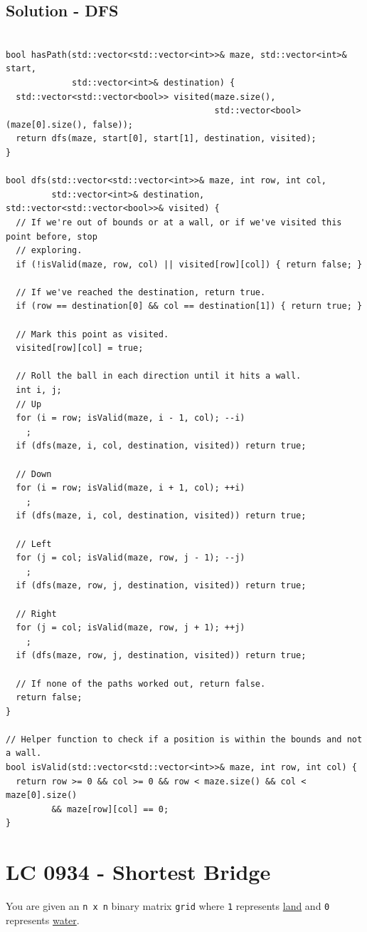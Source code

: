 \subsection*{Solution - DFS}
\begin{lstlisting}

bool hasPath(std::vector<std::vector<int>>& maze, std::vector<int>& start,
             std::vector<int>& destination) {
  std::vector<std::vector<bool>> visited(maze.size(),
                                         std::vector<bool>(maze[0].size(), false));
  return dfs(maze, start[0], start[1], destination, visited);
}

bool dfs(std::vector<std::vector<int>>& maze, int row, int col,
         std::vector<int>& destination, std::vector<std::vector<bool>>& visited) {
  // If we're out of bounds or at a wall, or if we've visited this point before, stop
  // exploring.
  if (!isValid(maze, row, col) || visited[row][col]) { return false; }

  // If we've reached the destination, return true.
  if (row == destination[0] && col == destination[1]) { return true; }

  // Mark this point as visited.
  visited[row][col] = true;

  // Roll the ball in each direction until it hits a wall.
  int i, j;
  // Up
  for (i = row; isValid(maze, i - 1, col); --i)
    ;
  if (dfs(maze, i, col, destination, visited)) return true;

  // Down
  for (i = row; isValid(maze, i + 1, col); ++i)
    ;
  if (dfs(maze, i, col, destination, visited)) return true;

  // Left
  for (j = col; isValid(maze, row, j - 1); --j)
    ;
  if (dfs(maze, row, j, destination, visited)) return true;

  // Right
  for (j = col; isValid(maze, row, j + 1); ++j)
    ;
  if (dfs(maze, row, j, destination, visited)) return true;

  // If none of the paths worked out, return false.
  return false;
}

// Helper function to check if a position is within the bounds and not a wall.
bool isValid(std::vector<std::vector<int>>& maze, int row, int col) {
  return row >= 0 && col >= 0 && row < maze.size() && col < maze[0].size()
         && maze[row][col] == 0;
}
\end{lstlisting}

\section{LC 0934 - Shortest Bridge}
You are given an {\colorbox{CodeBackground}{\lstinline|n x n|}} binary matrix {\colorbox{CodeBackground}{\lstinline|grid|}} where {\colorbox{CodeBackground}{\lstinline|1|}} represents \ul{land} and {\colorbox{CodeBackground}{\lstinline|0|}} represents \ul{water}.\\

